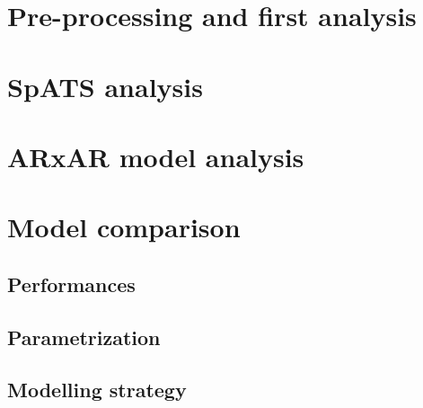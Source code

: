 \section{Pre-processing and first analysis}
\section{SpATS analysis}
\section{ARxAR model analysis}
\section{Model comparison}
\subsection{Performances}
\subsection{Parametrization}
\subsection{Modelling strategy}
